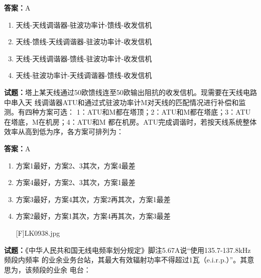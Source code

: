 \documentclass{ctexbook}
\begin{document}
\textbf{答案：}A 

\begin{enumerate}[leftmargin=3em]
  \item 天线-天线调谐器-驻波功率计-馈线-收发信机 

  \item 天线-馈线-天线调谐器-驻波功率计-收发信机 

  \item 天线-天线调谐器-馈线-驻波功率计-收发信机 

  \item 天线-驻波功率计-天线调谐器-馈线-收发信机 

\end{enumerate}





\vspace{1em}

\textbf{试题：}塔上某天线通过50欧馈线连至50欧输出阻抗的收发信机。现需要在天线电路中串入天
线调谐器ATU和通过式驻波功率计M对天线的匹配情况进行补偿和监测。有四种方案可选：
1：ATU和M都在塔顶；2：ATU和M都在塔底；3：ATU在塔底，M在机房；4：ATU和M
都在机房。ATU完成调谐时，若按天线系统整体效率从高到低为序，各方案可排列为： 

\textbf{答案：}A 

\begin{enumerate}[leftmargin=3em]
  \item 方案1最好，方案2、3其次，方案4最差 

  \item 方案4最好，方案2、3其次，方案1最差 

  \item 方案3最好，方案4其次，方案2再其次，方案1最差 

  \item 方案2最好，方案1其次，方案4再其次，方案3最差 

[F]LK0938.jpg 

\end{enumerate}





\vspace{1em}

\textbf{试题：}《中华人民共和国无线电频率划分规定》脚注5.67A说“使用135.7-137.8kHz频段内频率
的业余业务台站，其最大有效辐射功率不得超过1瓦（e.i.r.p.）”。其意思为，该频段的业余
电台： 
\end{document}
